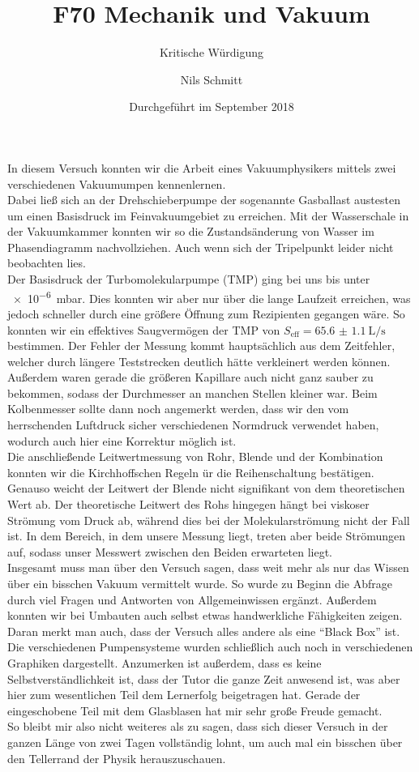 \documentclass[12pt,
				 a4paper,
				numbers=endperiod
				 ]{scrartcl}
\title{F70 Mechanik und Vakuum}
\subtitle{Kritische Würdigung}
\author{Nils Schmitt}
\date{Durchgeführt im September 2018}
\begin{document}
\maketitle
In diesem Versuch konnten wir die Arbeit eines Vakuumphysikers mittels zwei verschiedenen Vakuumumpen kennenlernen.\\

Dabei ließ sich an der Drehschieberpumpe der sogenannte Gasballast austesten um einen Basisdruck im Feinvakuumgebiet zu erreichen.
Mit der Wasserschale in der Vakuumkammer konnten wir so die Zustandsänderung von Wasser im Phasendiagramm nachvollziehen.
Auch wenn sich der Tripelpunkt leider nicht beobachten lies.\\
Der Basisdruck der Turbomolekularpumpe (TMP) ging bei uns bis unter \SI{e-6}{\milli\bar}.
Dies konnten wir aber nur über die lange Laufzeit erreichen, was jedoch schneller durch eine größere Öffnung zum Rezipienten gegangen wäre.
So konnten wir ein effektives Saugvermögen der TMP von $S_{\text{eff}}=\SI{65.6(11)}{\liter\per\second}$ bestimmen.
Der Fehler der Messung kommt hauptsächlich aus dem Zeitfehler, welcher durch längere Teststrecken deutlich hätte verkleinert werden können.
Außerdem waren gerade die größeren Kapillare auch nicht ganz sauber zu bekommen, sodass der Durchmesser an manchen Stellen kleiner war.
Beim Kolbenmesser sollte dann noch angemerkt werden, dass wir den vom herrschenden Luftdruck sicher verschiedenen Normdruck verwendet haben, wodurch auch hier eine Korrektur möglich ist.\\

Die anschließende Leitwertmessung von Rohr, Blende und der Kombination konnten wir die Kirchhoffschen Regeln ür die Reihenschaltung bestätigen.
Genauso weicht der Leitwert der Blende nicht signifikant von dem theoretischen Wert ab.
Der theoretische Leitwert des Rohs hingegen hängt bei viskoser Strömung vom Druck ab, während dies bei der Molekularströmung nicht der Fall ist.
In dem Bereich, in dem unsere Messung liegt, treten aber beide Strömungen auf, sodass unser Messwert zwischen den Beiden erwarteten liegt.\\

Insgesamt muss man über den Versuch sagen, dass weit mehr als nur das Wissen über ein bisschen Vakuum vermittelt wurde.
So wurde zu Beginn die Abfrage durch viel Fragen und Antworten von Allgemeinwissen ergänzt.
Außerdem konnten wir bei Umbauten auch selbst etwas handwerkliche Fähigkeiten zeigen.
Daran merkt man auch, dass der Versuch alles andere als eine \enquote{Black Box} ist.
Die verschiedenen Pumpensysteme wurden schließlich auch noch in verschiedenen Graphiken dargestellt.
Anzumerken ist außerdem, dass es keine Selbstverständlichkeit ist, dass der Tutor die ganze Zeit anwesend ist, was aber hier zum wesentlichen Teil dem Lernerfolg beigetragen hat.
Gerade der eingeschobene Teil mit dem Glasblasen hat mir sehr große Freude gemacht.\\
So bleibt mir also nicht weiteres als zu sagen, dass sich dieser Versuch in der ganzen Länge von zwei Tagen vollständig lohnt, um auch mal ein bisschen über den Tellerrand der Physik herauszuschauen.
\end{document}
